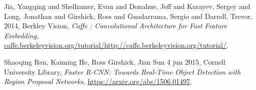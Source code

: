 \begin{thebibliography}{9}
  Jia, Yangqing and Shelhamer, Evan and Donahue, Jeff and Karayev, Sergey and Long, Jonathan and Girshick, Ross and Guadarrama, Sergio and Darrell, Trevor,
  2014,
  Berkley Vision,
  \emph{Caffe : Convolutional Architecture for Fast Feature Embedding},
  \url{caffe.berkeleyvision.org/tutorial/http://caffe.berkeleyvision.org/tutorial/}.

  Shaoqing Ren, Kaiming He, Ross Girshick, Jian Sun
  4 jun 2015,
  Cornell University Library,
  \emph{Faster R-CNN: Towards Real-Time Object Detection with Region Proposal Networks},
  \url{https://arxiv.org/abs/1506.01497}.
  
\end{thebibliography}